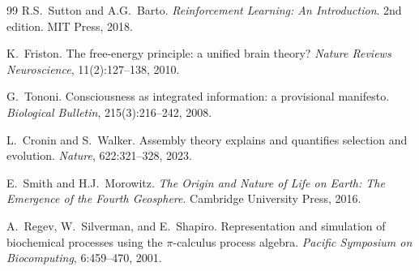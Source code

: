 \documentclass[12pt]{article}
\theoremstyle{remark}
\begin{document}
\begin{thebibliography}{99}
R.S.~Sutton and A.G.~Barto.
\newblock \emph{Reinforcement Learning: An Introduction}.
\newblock 2nd edition. MIT Press, 2018.

K.~Friston.
\newblock The free-energy principle: a unified brain theory?
\newblock \emph{Nature Reviews Neuroscience}, 11(2):127--138, 2010.

G.~Tononi.
\newblock Consciousness as integrated information: a provisional manifesto.
\newblock \emph{Biological Bulletin}, 215(3):216--242, 2008.

L.~Cronin and S.~Walker.
\newblock Assembly theory explains and quantifies selection and evolution.
\newblock \emph{Nature}, 622:321--328, 2023.

E.~Smith and H.J.~Morowitz.
\newblock \emph{The Origin and Nature of Life on Earth: The Emergence
of the Fourth Geosphere}.
\newblock Cambridge University Press, 2016.

A.~Regev, W.~Silverman, and E.~Shapiro.
\newblock Representation and simulation of biochemical processes using
the $\pi$-calculus process algebra.
\newblock \emph{Pacific Symposium on Biocomputing}, 6:459--470, 2001.

\end{thebibliography}
\end{document}
